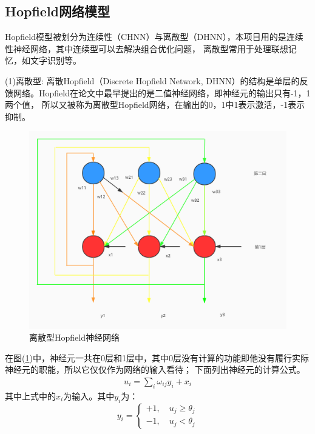 \subsection{Hopfield网络模型}
Hopfield模型被划分为连续性（CHNN）与离散型（DHNN），本项目用的是连续性神经网络，其中连续型可以去解决组合优化问题，
离散型常用于处理联想记忆，如文字识别等。
\par
(1)离散型:
\newline
离散Hopfield（Discrete Hopfield Network, DHNN）的结构是单层的反馈网络。Hopfield在论文中最早提出的是二值神经网络，即神经元的输出只有-1，1两个值，
所以又被称为离散型Hopfield网络，在输出的0，1中1表示激活，-1表示抑制。
\begin{figure}[htbp]
    \centering
    \includegraphics[width=13cm]{figure/DHNN.jpg}
    \caption{离散型Hopfield神经网络}
    \label{fig-DHNN}
\end{figure}
在图(\ref{fig-DHNN})中，神经元一共在0层和1层中，其中0层没有计算的功能即他没有履行实际神经元的职能，所以它仅仅作为网络的输入看待；
下面列出神经元的计算公式。
\begin{align}
    u_i = \sum_i \omega_{ij} y_i + x_i
\end{align}
其中上式中的$x_i$为输入。其中$y_i$为：
\begin{equation}
    y_i=
    \begin{cases}
        +1,\quad u_j \ge \theta_j \\
        -1,\quad u_j < \theta_j
    \end{cases}
\end{equation}
